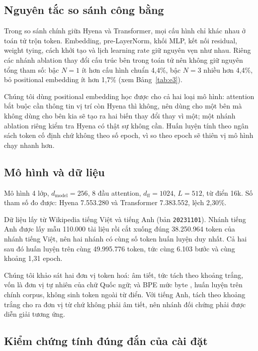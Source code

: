 \documentclass[11pt]{article}
\begin{document}
\subsection{Nguyên tắc so sánh công bằng}

Trong so sánh chính giữa Hyena và Transformer, mọi cấu hình chỉ khác nhau ở
toán tử trộn token. Embedding, pre-LayerNorm, khối MLP, kết nối residual,
weight tying, cách khởi tạo và lịch learning rate giữ nguyên vẹn như nhau.
Riêng các nhánh ablation thay đổi cấu trúc bên trong toán tử nên
không giữ nguyên tổng tham số: bậc $N = 1$ ít hơn cấu hình chuẩn 4,4\%, bậc
$N = 3$ nhiều hơn 4,4\%, bỏ positional embedding ít hơn 1,7\% (xem
Bảng~\ref{tab:e3}).

Chúng tôi dùng positional embedding học được cho cả hai loại mô hình: attention
bắt buộc cần thông tin vị trí còn Hyena thì không, nên dùng cho một bên mà không
dùng cho bên kia sẽ tạo ra hai biến thay đổi thay vì một; một nhánh ablation
riêng kiểm tra Hyena có thật sự không cần. Huấn luyện tính theo ngân sách token
cố định chứ không theo số epoch, vì so theo epoch sẽ thiên vị mô hình chạy nhanh
hơn.

\subsection{Mô hình và dữ liệu}

Mô hình 4 lớp, $d_{\text{model}} = 256$, 8 đầu attention, $d_{\text{ff}} = 1024$,
$L = 512$, từ điển 16k. Số tham số đo được: Hyena 7.553.280 và Transformer
7.383.552, lệch 2,30\%.

Dữ liệu lấy từ Wikipedia tiếng Việt và tiếng Anh (bản \texttt{20231101}).
Nhánh tiếng Anh được lấy mẫu 110.000 tài liệu rồi cắt xuống đúng 38.250.964
token của nhánh tiếng Việt, nên hai nhánh có cùng số token huấn luyện duy nhất.
Cả hai sau đó huấn luyện trên cùng 49.995.776 token, tức cùng 6.103 bước và
cùng khoảng 1,31 epoch.

Chúng tôi khảo sát hai đơn vị token hoá: âm tiết, tức tách theo khoảng trắng, vốn
là đơn vị tự nhiên của chữ Quốc ngữ; và BPE \citep{sennrich2016bpe} mức byte
\citep{radford2019gpt2}, huấn luyện trên chính corpus, không sinh token ngoài từ
điển. Với tiếng Anh, tách theo khoảng trắng cho ra đơn vị từ chứ không phải âm
tiết, nên nhánh đối chứng phải được diễn giải tương ứng.

\subsection{Kiểm chứng tính đúng đắn của cài đặt}
\end{document}
